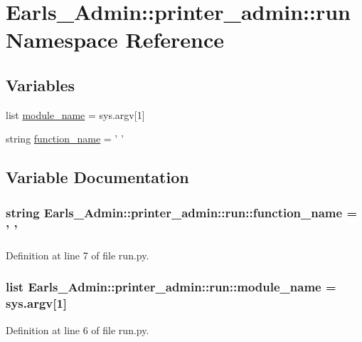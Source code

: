 \hypertarget{namespaceEarls__Admin_1_1printer__admin_1_1run}{
\section{Earls\_\-Admin::printer\_\-admin::run Namespace Reference}
\label{namespaceEarls__Admin_1_1printer__admin_1_1run}
}


\subsection*{Variables}
\begin{CompactItemize}
\item 
list \hyperlink{namespaceEarls__Admin_1_1printer__admin_1_1run_95c1ffc5e0fdd0b51700a84ed92a423a}{module\_\-name} = sys.argv\mbox{[}1\mbox{]}
\item 
string \hyperlink{namespaceEarls__Admin_1_1printer__admin_1_1run_86444a66224fd80dcbda1fec79f76cd6}{function\_\-name} = ' '
\end{CompactItemize}


\subsection{Variable Documentation}
\hypertarget{namespaceEarls__Admin_1_1printer__admin_1_1run_86444a66224fd80dcbda1fec79f76cd6}{
\subsubsection[function\_\-name]{\setlength{\rightskip}{0pt plus 5cm}string {\bf Earls\_\-Admin::printer\_\-admin::run::function\_\-name} = ' '}}
\label{namespaceEarls__Admin_1_1printer__admin_1_1run_86444a66224fd80dcbda1fec79f76cd6}




Definition at line 7 of file run.py.\hypertarget{namespaceEarls__Admin_1_1printer__admin_1_1run_95c1ffc5e0fdd0b51700a84ed92a423a}{
\subsubsection[module\_\-name]{\setlength{\rightskip}{0pt plus 5cm}list {\bf Earls\_\-Admin::printer\_\-admin::run::module\_\-name} = sys.argv\mbox{[}1\mbox{]}}}
\label{namespaceEarls__Admin_1_1printer__admin_1_1run_95c1ffc5e0fdd0b51700a84ed92a423a}




Definition at line 6 of file run.py.